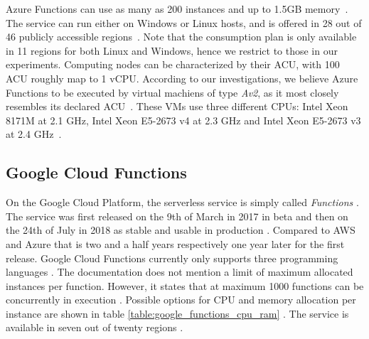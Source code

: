 Azure Functions can use as many as 200 instances and up to 1.5GB memory~\cite{AzureFunctionsPlans}. 
The service can run either on Windows or Linux hosts, and is offered in 28 out of 46 publicly accessible regions~\cite{AzureRegions}.
Note that the consumption plan is only available in 11 regions for both Linux and Windows, hence we restrict to those in our experiments.
Computing nodes can be characterized by their \gls{ACU}, with 100 ACU roughly map to 1 \gls{vCPU}.
According to our investigations, we believe Azure Functions to be executed by virtual machiens of type \textit{Av2}, as it most closely resembles its declared \gls{ACU}~\cite{AzureFunctionsVMs}. 
These \gls{VM}s use three different \gls{CPU}s: Intel Xeon 8171M at 2.1 \gls{GHz}, Intel Xeon E5-2673 v4 at 2.3 \gls{GHz} and Intel Xeon E5-2673 v3 at 2.4 \gls{GHz}~\cite{AzureFunctionsVMs}.

\subsection{Google Cloud Functions}
On the Google Cloud Platform, the serverless service is simply called \textit{Functions} \cite{GoogleFunctions}. The service was first released on the 9th of March in 2017 in beta and then on the 24th of July in 2018 as stable and usable in production \cite{GoogleFunctionsReleases}. Compared to AWS and Azure that is two and a half years respectively one year later for the first release. Google Cloud Functions currently only supports three programming languages \cite{GoogleFunctionsLanguages}. The documentation does not mention a limit of maximum allocated instances per function. However, it states that at maximum 1000 functions can be concurrently in execution \cite{GoogleFunctionsQuotas}. Possible options for CPU and memory allocation per instance are shown in table \ref{table:google_functions_cpu_ram} \cite{GoogleFunctionsPricing}. The service is available in seven out of twenty regions \cite{GoogleFunctionsLocations}.

